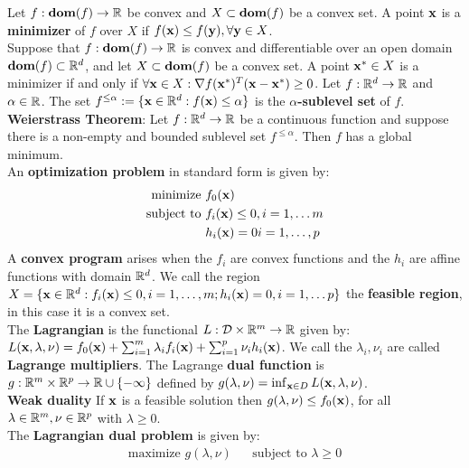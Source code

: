 Let $f : \textbf{dom}(f) \rightarrow \mathbb{R}$ be convex and $X \subset \textbf{dom}(f)$ be a convex set. A point $\mathbf{x}$ is a \textbf{minimizer} of $f$ over $X$ if $f(\mathbf{x}) \leq f(\mathbf{y}), \forall \mathbf{y} \in X$. \\
Suppose that $f : \textbf{dom}(f) \rightarrow \mathbb{R}$ is convex and differentiable over an open domain $\textbf{dom}(f) \subset \mathbb{R}^d$, and let $X \subset \textbf{dom}(f)$ be a convex set. A point $\mathbf{x}^* \in X$ is a minimizer if and only if $\forall \mathbf{x} \in X : \nabla f(\mathbf{x}^*)^T (\mathbf{x} - \mathbf{x}^*) \geq 0$.
Let $f : \mathbb{R}^d \rightarrow \mathbb{R}$ and $\alpha \in \mathbb{R}$. The set $f^{\leq \alpha} := \{\mathbf{x} \in \mathbb{R}^d: f(\mathbf{x}) \leq \alpha\}$ is the \textbf{$\alpha$-sublevel set} of $f$. \\
\textbf{Weierstrass Theorem}: Let  $f : \mathbb{R}^d \rightarrow \mathbb{R}$ be a continuous function and suppose there is a non-empty and bounded sublevel set $f^{\leq \alpha}$. Then $f$ has a global minimum. \\
An \textbf{optimization problem} in standard form is given by: 
\begin{align*}
    \text{minimize }   &f_0(\mathbf{x}) \\
    \text{subject to } &f_i(\mathbf{x}) \leq 0, i=1, \dots m \\
                       &h_i(\mathbf{x}) = 0 i=1, \dots, p
\end{align*}
A \textbf{convex program} arises when the $f_i$ are convex functions and the $h_i$ are affine functions with domain $\mathbb{R}^d$. We call the region $X = \{\mathbf{x} \in \mathbb{R}^d : f_i(\mathbf{x})\leq 0, i=1, \dots, m; h_i(\mathbf{x}) =0, i=1, \dots p\}$ the \textbf{feasible region}, in this case it is a convex set. \\
The \textbf{Lagrangian} is the functional $L : \mathcal{D} \times \mathbb{R}^m \rightarrow \mathbb{R}$ given by: $L(\mathbf{x}, \mathbb{\lambda}, \mathbb{\nu}) = f_0(\mathbf{x}) + \sum_{i=1}^m{\lambda_i f_i(\mathbf{x})} + \sum_{i=1}^p{\nu_i h_i(\mathbf{x})}$. We call the $\lambda_i, \nu_i$ are called \textbf{Lagrange multipliers}. The Lagrange \textbf{dual function} is $g : \mathbb{R}^m \times \mathbb{R}^p \rightarrow \mathbb{R} \cup \{- \infty\}$ defined by $g(\mathbb{\lambda}, \mathbb{\nu}) = \inf_{\mathbf{x} \in D} L(\mathbf{x}, \mathbb{\lambda}, \mathbb{\nu})$. \\
\textbf{Weak duality} If $\mathbf{x}$ is a feasible solution then $g(\mathbb{\lambda}, \mathbb{\nu}) \leq f_0(\mathbf{x})$, for all $\mathbb{\lambda} \in \mathbb{R}^m, \mathbb{\nu} \in \mathbb{R}^p$ with $\mathbb{\lambda} \geq 0$. \\
The \textbf{Lagrangian dual problem} is given by:
\begin{align*}
    \text{maximize }   g(\mathbb{\lambda}, \mathbb{\nu}) && \text{subject to }  \mathbb{\lambda} \geq 0
\end{align*}
